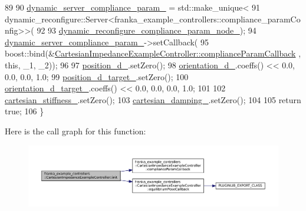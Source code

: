 \begin{DoxyCode}
89 
90   \hyperlink{classfranka__example__controllers_1_1CartesianImpedanceExampleController_a43319973f57653a9d64bdafbeea2cf03}{dynamic\_server\_compliance\_param\_} = std::make\_unique<
91       dynamic\_reconfigure::Server<franka\_example\_controllers::compliance\_paramConfig>>(
92 
93       \hyperlink{classfranka__example__controllers_1_1CartesianImpedanceExampleController_a5c360df35cb2e4e32b47746a40ed95b1}{dynamic\_reconfigure\_compliance\_param\_node\_});
94   \hyperlink{classfranka__example__controllers_1_1CartesianImpedanceExampleController_a43319973f57653a9d64bdafbeea2cf03}{dynamic\_server\_compliance\_param\_}->setCallback(
95       boost::bind(&\hyperlink{classfranka__example__controllers_1_1CartesianImpedanceExampleController_a31f27ea8c8f60f073fb50c78cf48ab6c}{CartesianImpedanceExampleController::complianceParamCallback}
      , \textcolor{keyword}{this}, \_1, \_2));
96 
97   \hyperlink{classfranka__example__controllers_1_1CartesianImpedanceExampleController_a7b1ed13a31a9561ced03a8a9221a303f}{position\_d\_}.setZero();
98   \hyperlink{classfranka__example__controllers_1_1CartesianImpedanceExampleController_a8528ed0cf7de6439e65bb1d4c4017137}{orientation\_d\_}.coeffs() << 0.0, 0.0, 0.0, 1.0;
99   \hyperlink{classfranka__example__controllers_1_1CartesianImpedanceExampleController_a2d30d23bda9622c57d2e894cfd00cc37}{position\_d\_target\_}.setZero();
100   \hyperlink{classfranka__example__controllers_1_1CartesianImpedanceExampleController_ae2c7eed26db0a1b708b91148451bb13e}{orientation\_d\_target\_}.coeffs() << 0.0, 0.0, 0.0, 1.0;
101 
102   \hyperlink{classfranka__example__controllers_1_1CartesianImpedanceExampleController_a37535313bb87e462a6c187c7ddce520f}{cartesian\_stiffness\_}.setZero();
103   \hyperlink{classfranka__example__controllers_1_1CartesianImpedanceExampleController_a95cb6cf998a392f5bf9fa1201f0c595d}{cartesian\_damping\_}.setZero();
104 
105   \textcolor{keywordflow}{return} \textcolor{keyword}{true};
106 \}
\end{DoxyCode}
Here is the call graph for this function\+:
\nopagebreak
\begin{figure}[H]
\begin{center}
\leavevmode
\includegraphics[width=350pt]{classfranka__example__controllers_1_1CartesianImpedanceExampleController_aa61fee8f409bbfda931c202123dbd7f5_cgraph}
\end{center}
\end{figure}
